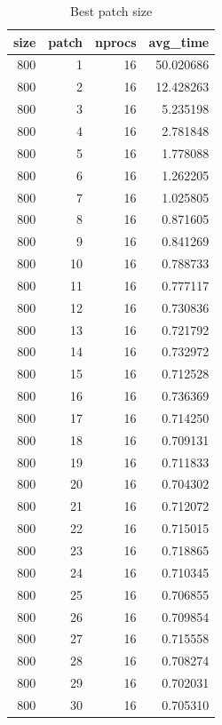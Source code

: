 \documentclass[a4paper,%
11pt,%
DIV12,
headsepline,%
headings=normal,
]{scrartcl}
\begin{document}
\begin{table}[htb!]
\centering 
\caption{\label{tab:best_patch_size}Best patch size}
\begin{tabular}{rrrr}
\toprule
size & patch & nprocs & avg\_time \\
\midrule
800 & 1 & 16 & 50.020686 \\
800 & 2 & 16 & 12.428263 \\
800 & 3 & 16 & 5.235198 \\
800 & 4 & 16 & 2.781848 \\
800 & 5 & 16 & 1.778088 \\
800 & 6 & 16 & 1.262205 \\
800 & 7 & 16 & 1.025805 \\
800 & 8 & 16 & 0.871605 \\
800 & 9 & 16 & 0.841269 \\
800 & 10 & 16 & 0.788733 \\
800 & 11 & 16 & 0.777117 \\
800 & 12 & 16 & 0.730836 \\
800 & 13 & 16 & 0.721792 \\
800 & 14 & 16 & 0.732972 \\
800 & 15 & 16 & 0.712528 \\
800 & 16 & 16 & 0.736369 \\
800 & 17 & 16 & 0.714250 \\
800 & 18 & 16 & 0.709131 \\
800 & 19 & 16 & 0.711833 \\
800 & 20 & 16 & 0.704302 \\
800 & 21 & 16 & 0.712072 \\
800 & 22 & 16 & 0.715015 \\
800 & 23 & 16 & 0.718865 \\
800 & 24 & 16 & 0.710345 \\
800 & 25 & 16 & 0.706855 \\
800 & 26 & 16 & 0.709854 \\
800 & 27 & 16 & 0.715558 \\
800 & 28 & 16 & 0.708274 \\
800 & 29 & 16 & 0.702031 \\
800 & 30 & 16 & 0.705310 \\
\bottomrule
\end{tabular}
\end{table}
\end{document}
